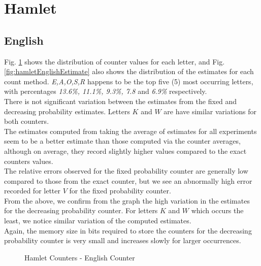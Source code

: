 \documentclass[longpaper, english, final, times]{revdetua}
\begin{document}
			
	\section{Hamlet}
		\subsection{English}
			Fig. \ref{fig:hamletEnglishCounter} shows the distribution of counter values for each letter, and Fig. \ref{fig:hamletEnglishEstimate} also shows the distribution of the estimates for each count method. \textit{E,A,O,S,R} happens to be the top five (5) most occurring letters, with percentages \textit{13.6\%, 11.1\%, 9.3\%, 7.8} and  \textit{6.9\%} respectively.\\
			
			There is not significant variation between the estimates from the fixed and decreasing probability estimates. Letters $K$ and $W$ are have similar variations for both counters. \\
			
			The estimates computed from taking the average of estimates for all experiments seem to be a better estimate than those computed via the counter averages, although on average, they record slightly higher values compared to the exact counters values.\\
			
			The relative errors observed for the fixed probability counter are generally low compared to those from the exact counter, but we see an abnormally high error recorded for letter $V$ for the fixed probability counter.\\
			
			From the above, we confirm from the graph the high variation in the estimates for the decreasing probability counter. For letters $K$ and $W$ which occurs the least, we notice similar variation of the computed estimates. \\
			
			Again, the memory size in bits required to store the counters for the decreasing probability counter is very small and increases slowly for larger occurrences.
			\begin{figure}[h]
				\caption{Hamlet Counters - English Counter}
				\begin{center}
				\end{center}
				\label{fig:hamletEnglishCounter}
			\end{figure}
			
\end{document}
